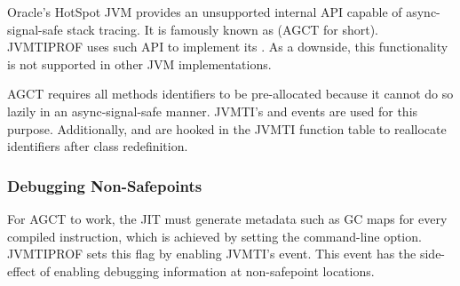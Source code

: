 Oracle's HotSpot JVM provides an unsupported internal API capable of async-signal-safe stack tracing. It is famously known as  (AGCT for short). JVMTIPROF uses such API to implement its . As a downside, this functionality is not supported in other JVM implementations.

AGCT requires all methods identifiers to be pre-allocated because it cannot do so lazily in an async-signal-safe manner. JVMTI's  and  events are used for this purpose. Additionally,  and  are hooked in the JVMTI function table to reallocate identifiers after class redefinition.

\subsubsection*{Debugging Non-Safepoints}

For AGCT to work, the JIT must generate metadata such as GC maps for every compiled instruction, which is achieved by setting the  command-line option. JVMTIPROF sets this flag by enabling JVMTI's  event. This event has the side-effect of enabling debugging information at non-safepoint locations.

